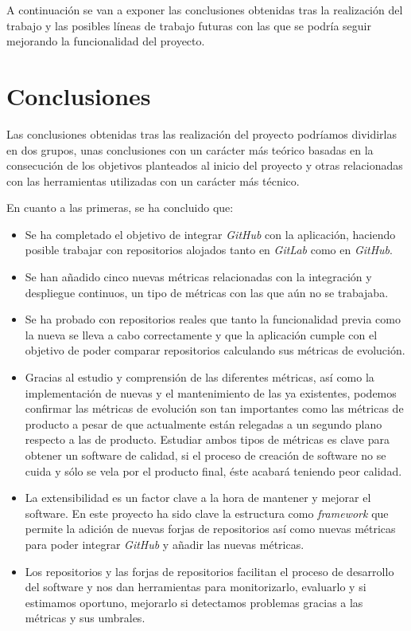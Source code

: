 
A continuación se van a exponer las conclusiones obtenidas tras la realización del trabajo y las posibles líneas de trabajo futuras con las que se podría seguir mejorando la funcionalidad del proyecto.

\section{Conclusiones}
Las conclusiones obtenidas tras las realización del proyecto podríamos dividirlas en dos grupos, unas conclusiones con un carácter más teórico basadas en la consecución de los objetivos planteados al inicio del proyecto y otras relacionadas con las herramientas utilizadas con un carácter más técnico.

En cuanto a las primeras, se ha concluido que:

\begin{itemize}
	\item Se ha completado el objetivo de integrar \textit{GitHub} con la aplicación, haciendo posible trabajar con repositorios alojados tanto en \textit{GitLab} como en \textit{GitHub}.
	\item Se han añadido cinco nuevas métricas relacionadas con la integración y despliegue continuos, un tipo de métricas con las que aún no se trabajaba.
	\item Se ha probado con repositorios reales que tanto la funcionalidad previa como la nueva se lleva a cabo correctamente y que la aplicación cumple con el objetivo de poder comparar repositorios calculando sus métricas de evolución.
	\item Gracias al estudio y comprensión de las diferentes métricas, así como la implementación de nuevas y el mantenimiento de las ya existentes, podemos confirmar las métricas de evolución son tan importantes como las métricas de producto a pesar de que actualmente están relegadas a un segundo plano respecto a las de producto. Estudiar ambos tipos de métricas es clave para obtener un software de calidad, si el proceso de creación de software no se cuida y sólo se vela por el producto final, éste acabará teniendo peor calidad. 
	\item La extensibilidad es un factor clave a la hora de mantener y mejorar el software. En este proyecto ha sido clave la estructura como \textit{framework} que permite la adición de nuevas forjas de repositorios así como nuevas métricas para poder integrar \textit{GitHub} y añadir las nuevas métricas.
	\item Los repositorios y las forjas de repositorios facilitan el proceso de desarrollo del software y nos dan herramientas para monitorizarlo, evaluarlo y si estimamos oportuno, mejorarlo si detectamos problemas gracias a las métricas y sus umbrales.
\end{itemize}

